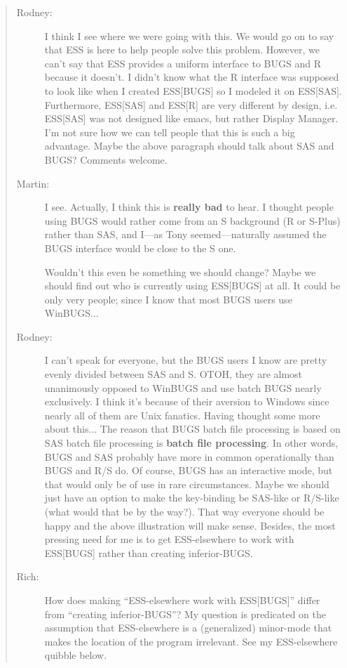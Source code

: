 \documentclass{article}
\newenvironment{Comment}{\begin{quote}\small\itshape }{\end{quote}}
\begin{document}
\begin{Comment}
\begin{description}
 \item[Rodney:]  I think I see where we were going with this.  We would go on to
say that ESS is here to help people solve this problem.  However,
we can't say that ESS provides a uniform interface to BUGS and R because
it doesn't.  I didn't know what the R interface was supposed to look like
when I created ESS[BUGS] so I modeled it on ESS[SAS].  Furthermore,
ESS[SAS] and ESS[R] are very different by design, i.e. ESS[SAS] was not
designed like emacs, but rather Display Manager.  I'm not sure how we can tell
people that this is such a big advantage.  Maybe the above paragraph
should talk about SAS and BUGS?  Comments welcome.

\item[Martin:] I see. Actually, I think this is \textbf{really bad} to hear.
  I thought people using BUGS would rather come from an S background
  (R or S-Plus) rather than SAS, and I---as Tony seemed---naturally
  assumed the BUGS interface would be close to the S one.

  Wouldn't this even be something we should change?  Maybe we should find
  out who is currently using ESS[BUGS] at all. It could be only very
  people; since I know that most BUGS users use WinBUGS...

\item[Rodney:]  I can't speak for everyone, but the BUGS users I know are
pretty evenly divided between SAS and S.  OTOH, they are almost 
unanimously opposed to WinBUGS and use batch BUGS nearly exclusively.
I think it's because of their aversion to Windows since nearly all of
them are Unix fanatics.  
Having thought some more about this...  The reason that BUGS batch file
processing is based on SAS batch file processing is \textbf{batch file processing}.
In other words, BUGS and SAS probably have more in common operationally
than BUGS and R/S do.  Of course, BUGS has an interactive mode, but that
would only be of use in rare circumstances.  Maybe we should just have an 
option to make the key-binding be SAS-like or R/S-like (what would that be 
by the way?).  That way everyone should be happy and the above illustration
will make sense.  Besides, the most pressing need for me is to get 
ESS-elsewhere to work with ESS[BUGS] rather than creating inferior-BUGS.

\item[Rich:] How does making ``ESS-elsewhere work with ESS[BUGS]'' differ
from ``creating inferior-BUGS''?  My question is predicated on the assumption
that ESS-elsewhere is a (generalized) minor-mode that makes the location
of the program irrelevant.
See my ESS-elsewhere quibble below.


\end{description}
\end{Comment}
\end{document}
